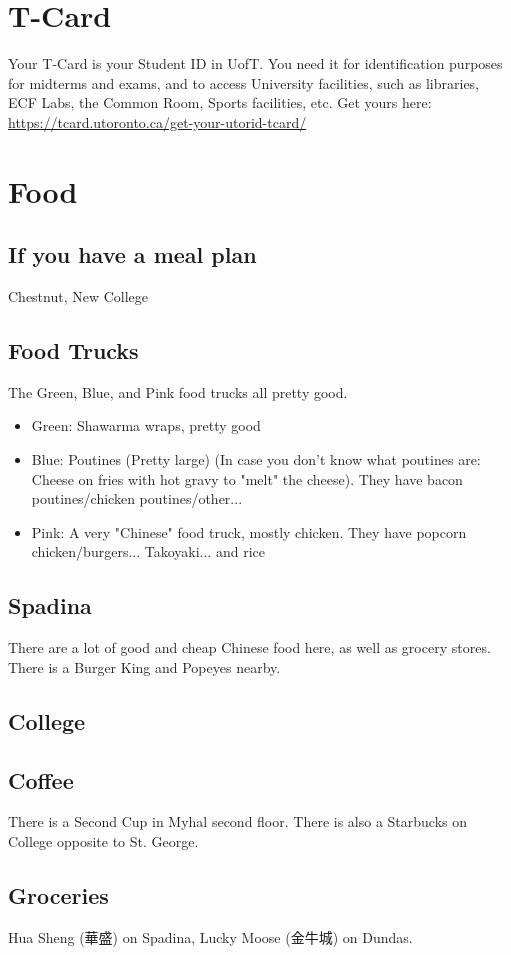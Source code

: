 \section{T-Card}

Your T-Card is your Student ID in UofT. You need it for identification purposes for midterms and exams, and to access University facilities, such as libraries, ECF Labs, the Common Room, Sports facilities, etc. Get yours here: \url{https://tcard.utoronto.ca/get-your-utorid-tcard/}

\section{Food}

\subsection{If you have a meal plan}

Chestnut, New College

\subsection{Food Trucks}

The Green, Blue, and Pink food trucks all pretty good. 

\begin{itemize}
    \item Green: Shawarma wraps, pretty good
    \item Blue: Poutines (Pretty large) (In case you don't know what poutines are: Cheese on fries with hot gravy to "melt" the cheese). They have bacon poutines/chicken poutines/other...
    \item Pink: A very "Chinese" food truck, mostly chicken. They have popcorn chicken/burgers... Takoyaki... and rice
\end{itemize}

\subsection{Spadina}

There are a lot of good and cheap Chinese food here, as well as grocery stores. There is a Burger King and Popeyes nearby.

\subsection{College}


\subsection{Coffee}

There is a Second Cup in Myhal second floor. There is also a Starbucks on College opposite to St. George.

\subsection{Groceries}

Hua Sheng (華盛) on Spadina, Lucky Moose (金牛城) on Dundas.
